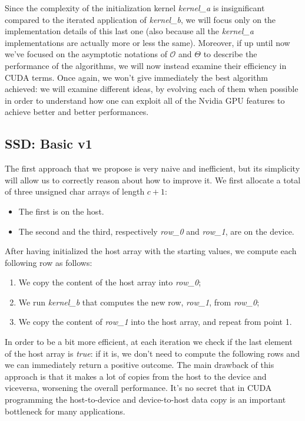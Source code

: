 \documentclass[12pt]{extarticle}
\begin{document}
Since the complexity of the initialization kernel \emph{kernel\_a} is insignificant compared to the iterated application of \emph{kernel\_b}, we will focus only on the implementation details of this last one (also because all the \emph{kernel\_a} implementations are actually more or less the same). Moreover, if up until now we've focused on the asymptotic notations of $\mathcal{O}$ and $\Theta$ to describe the performance of the algorithms, we will now instead examine their efficiency in CUDA terms.\newline
Once again, we won't give immediately the best algorithm achieved: we will examine different ideas, by evolving each of them when possible in order to understand how one can exploit all of the Nvidia GPU features to achieve better and better performances.
\subsection{SSD: Basic v1}
The first approach that we propose is very naive and inefficient, but its simplicity will allow us to correctly reason about how to improve it.\newline
We first allocate a total of three unsigned char arrays of length $c+1$:
\begin{itemize}
    \item The first is on the host.
    \item The second and the third, respectively \emph{row\_0} and \emph{row\_1}, are on the device.
\end{itemize}
After having initialized the host array with the starting values, we compute each following row as follows:
\begin{enumerate}
    \item We copy the content of the host array into \emph{row\_0};
    \item We run \emph{kernel\_b} that computes the new row, \emph{row\_1}, from \emph{row\_0};
    \item We copy the content of \emph{row\_1} into the host array, and repeat from point 1.
\end{enumerate}
In order to be a bit more efficient, at each iteration we check if the last element of the host array is \emph{true}: if it is, we don't need to compute the following rows and we can immediately return a positive outcome.\newline
The main drawback of this approach is that it makes a lot of copies from the host to the device and viceversa, worsening the overall performance. It's no secret that in CUDA programming the host-to-device and device-to-host data copy is an important bottleneck for many applications.\newline
\end{document}
